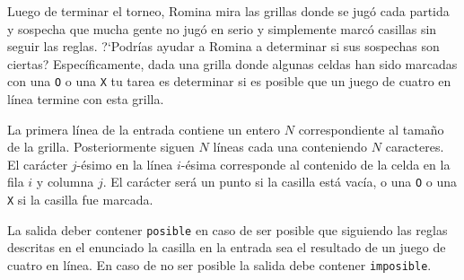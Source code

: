 \documentclass{oci}
\begin{document}
\begin{problemDescription}
\begin{center}
\begin{minipage}{0.8\textwidth}
  \vspace{0.2em}
  \end{minipage}
  \end{center}

  Luego de terminar el torneo, Romina mira
  las grillas donde se jugó cada partida
  y sospecha que mucha gente no jugó en serio y
  simplemente marcó casillas sin seguir las reglas.
  ?`Podrías ayudar a Romina a determinar si sus sospechas
  son ciertas?
  Específicamente, dada una grilla donde algunas
  celdas han sido marcadas con una \texttt{O} o una \texttt{X}
  tu tarea es determinar si es posible que un juego de cuatro en
  línea termine con esta grilla.
\end{problemDescription}

\begin{inputDescription}
  La primera línea de la entrada contiene un entero $N$ correspondiente
  al tamaño de la grilla.
  Posteriormente siguen $N$ líneas cada una conteniendo $N$ caracteres.
  El carácter $j$-ésimo en la línea $i$-ésima corresponde al contenido
  de la celda en la fila $i$ y columna $j$.
  El carácter será un punto si la casilla está vacía, o
  una \texttt{O} o una \texttt{X} si la casilla fue marcada.
\end{inputDescription}

\begin{outputDescription}
  La salida deber contener \texttt{posible} en caso de ser posible
  que siguiendo las reglas descritas en el enunciado la casilla en la
  entrada sea el resultado de un juego de cuatro en línea.
  En caso de no ser posible la salida debe contener \texttt{imposible}.
\end{outputDescription}
\end{document}
